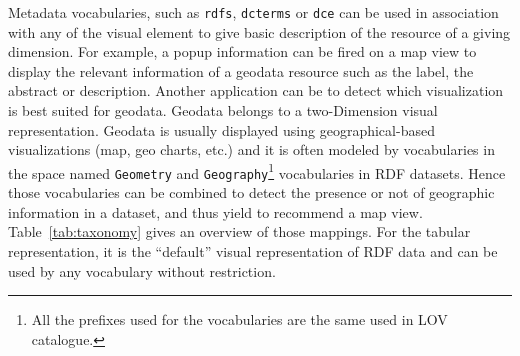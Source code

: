  Metadata vocabularies, such as \texttt{rdfs}, \texttt{dcterms} or \texttt{dce} can be used in association with any of the visual element to give basic description of the resource of a giving dimension. For example, a popup information can be fired on a map view to display the relevant information of a geodata resource such as the label, the abstract or description. 
Another application can be to detect which visualization is best suited for geodata. Geodata belongs to a  two-Dimension visual representation. Geodata is usually displayed using geographical-based visualizations (map, geo charts, etc.) and it is often modeled by vocabularies in the space named \texttt{Geometry} and \texttt{Geography}\footnote{All the prefixes used for the vocabularies are the same used in LOV catalogue.}   vocabularies in RDF datasets. Hence those vocabularies can be combined to detect the presence or not of geographic information in a dataset, and thus yield to recommend a map view. Table~\ref{tab:taxonomy} gives an overview of those mappings. For the tabular representation, it is the ``default'' visual representation of RDF data and can be used by any vocabulary without restriction. 


\begin{table}[!htbp]
\end{table}


